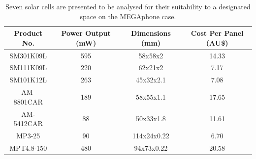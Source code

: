\begin{table} [h]
    \begin{center}
        \vspace{5mm}
        \caption{Seven solar cells are presented to be analysed for their suitability to a designated space on the MEGAphone case.}
        \label{tab:Solar}
        \begin{tabular}{ |c|c|c|c| }
        \hline
        Product No. & Power Output (mW) & Dimensions (mm) & Cost Per Panel (AU\$) \\
        \hline
        SM301K09L \cite{SM301K09L} & 595 & 58x58x2 & 14.33 \\
        \hline
        SM111K09L \cite{SM111K09L} & 220 & 62x21x2 & 7.17 \\ 
        \hline
        SM101K12L \cite{SM101K12L} & 263 & 45x32x2.1 & 7.08 \\
        \hline
        AM-8801CAR \cite{am8801} & 189 & 58x55x1.1 & 17.65 \\
        \hline
        AM-5412CAR \cite{am5412} & 88 & 50x33x1.8 & 11.61 \\
        \hline
        MP3-25 \cite{mp3} & 90 & 114x24x0.22 & 6.70 \\
        \hline
        MPT4.8-150 \cite{mpt} & 480 & 94x73x0.22 & 20.58 \\
        \hline
        \end{tabular}
    \end{center}
\end{table}

